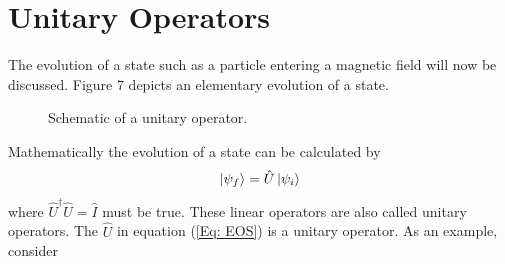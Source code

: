 \documentclass[twocolumn]{article}
\begin{document}
\section*{Unitary Operators}
The evolution of a state such as a particle entering a magnetic field will now be discussed. Figure 7 depicts an elementary evolution of a state.
\begin{figure}[ht]
    \centering
    \caption{\footnotesize{Schematic of a unitary operator.}}
    \label{Fig: UO}
\end{figure}
\par \noindent
Mathematically the evolution of a state can be calculated by
\begin{equation}\label{Eq: EOS}
\ket{\psi_f}=\hat{U}\ket{\psi_i}
\end{equation}
where $\hat{U}^{\dagger}\hat{U}=\hat{I}$ must be true. These linear operators are also called unitary operators.  The $\hat{U}$ in equation (\ref{Eq: EOS}) is a unitary operator. As an example, consider 
\end{document}
